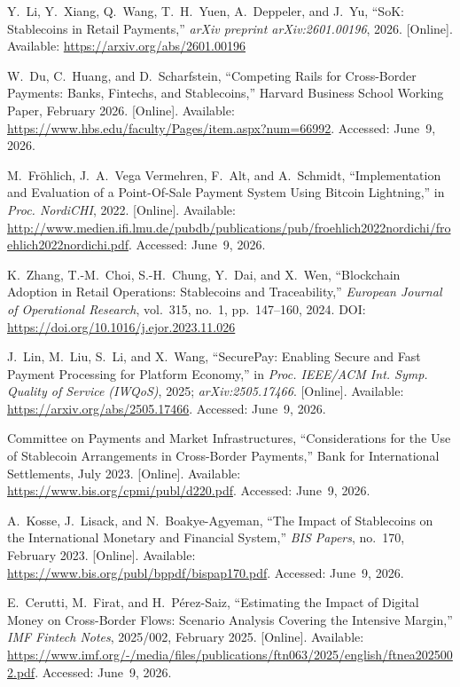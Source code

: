 \documentclass[12pt,a4paper]{report}
\begin{document}
{\begin{enumerate}[label={[\arabic*]}]
\item Y.~Li, Y.~Xiang, Q.~Wang, T.~H.~Yuen, A.~Deppeler, and J.~Yu, ``SoK: Stablecoins in Retail Payments,'' \textit{arXiv preprint arXiv:2601.00196}, 2026. [Online]. Available: \url{https://arxiv.org/abs/2601.00196}

\item W.~Du, C.~Huang, and D.~Scharfstein, ``Competing Rails for Cross-Border Payments: Banks, Fintechs, and Stablecoins,'' Harvard Business School Working Paper, February 2026. [Online]. Available: \url{https://www.hbs.edu/faculty/Pages/item.aspx?num=66992}. Accessed: June~9, 2026.

\item M.~Fr\"{o}hlich, J.~A.~Vega Vermehren, F.~Alt, and A.~Schmidt, ``Implementation and Evaluation of a Point-Of-Sale Payment System Using Bitcoin Lightning,'' in \textit{Proc. NordiCHI}, 2022. [Online]. Available: \url{http://www.medien.ifi.lmu.de/pubdb/publications/pub/froehlich2022nordichi/froehlich2022nordichi.pdf}. Accessed: June~9, 2026.

\item K.~Zhang, T.-M.~Choi, S.-H.~Chung, Y.~Dai, and X.~Wen, ``Blockchain Adoption in Retail Operations: Stablecoins and Traceability,'' \textit{European Journal of Operational Research}, vol.~315, no.~1, pp.~147--160, 2024. DOI: \url{https://doi.org/10.1016/j.ejor.2023.11.026}

\item J.~Lin, M.~Liu, S.~Li, and X.~Wang, ``SecurePay: Enabling Secure and Fast Payment Processing for Platform Economy,'' in \textit{Proc. IEEE/ACM Int. Symp. Quality of Service (IWQoS)}, 2025; \textit{arXiv:2505.17466}. [Online]. Available: \url{https://arxiv.org/abs/2505.17466}. Accessed: June~9, 2026.

\item Committee on Payments and Market Infrastructures, ``Considerations for the Use of Stablecoin Arrangements in Cross-Border Payments,'' Bank for International Settlements, July 2023. [Online]. Available: \url{https://www.bis.org/cpmi/publ/d220.pdf}. Accessed: June~9, 2026.

\item A.~Kosse, J.~Lisack, and N.~Boakye-Agyeman, ``The Impact of Stablecoins on the International Monetary and Financial System,'' \textit{BIS Papers}, no.~170, February 2023. [Online]. Available: \url{https://www.bis.org/publ/bppdf/bispap170.pdf}. Accessed: June~9, 2026.

\item E.~Cerutti, M.~Firat, and H.~P\'{e}rez-Saiz, ``Estimating the Impact of Digital Money on Cross-Border Flows: Scenario Analysis Covering the Intensive Margin,'' \textit{IMF Fintech Notes}, 2025/002, February 2025. [Online]. Available: \url{https://www.imf.org/-/media/files/publications/ftn063/2025/english/ftnea2025002.pdf}. Accessed: June~9, 2026.


\end{enumerate}}
\end{document}
